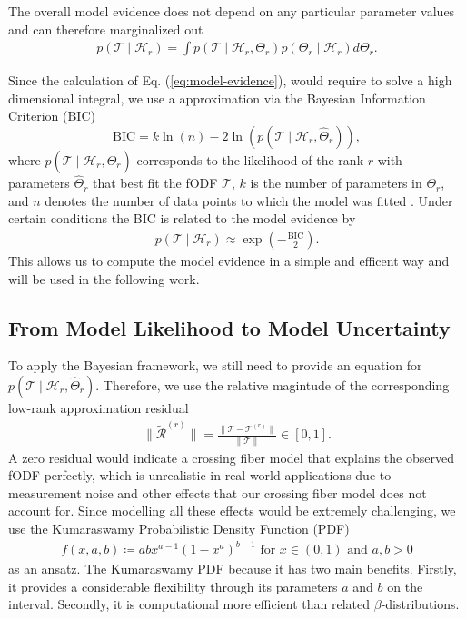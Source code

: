 The overall model evidence does not depend on any particular parameter values
and can therefore marginalized out 
\begin{align}
	p \left( \mathcal{T} \mid \mathcal{H}_r \right) = \int p \left(
		\mathcal{T} \mid \mathcal{H}_r , \Theta_r 
	\right) p \left( \Theta_r \mid \mathcal{H}_r  \right) d \Theta_r. 
	\label{eq:model-evidence}
\end{align}

Since the calculation of Eq. (\ref{eq:model-evidence}), would require to solve a
high dimensional integral, we use a approximation via the Bayesian Information
Criterion (BIC) 
\[ \text{BIC} = k \ln \left( n \right) - 2 \ln \left( p \left( \mathcal{T} \mid
\mathcal{H}_r, \hat{\Theta}_r \right) \right), \]
where $p \left(  \mathcal{T} \mid \mathcal{H}_r , \hat{\Theta}_r \right)$
corresponds to the likelihood of the rank-$r$ with parameters $\hat{\Theta}_r$
that best fit the fODF $\mathcal{T}$, $k$ is the number of parameters in
$\Theta_r$, and $n$ denotes the number of data points to which the model was
fitted \cite{Schwarz1978}. Under certain conditions the BIC is related to the
model evidence by \cite{Konishi2008}
\begin{align}
	p \left( \mathcal{T} \mid \mathcal{H}_r \right) \approx \exp \left(  -
		\frac{\text{BIC}}{2}
\right).
	\label{eq:BIC-model}
\end{align}
This allows us to compute the model evidence in a simple and efficent way and
will be used in the following work. 
\subsection{From Model Likelihood to Model Uncertainty}
To apply the Bayesian framework, we still need to provide an equation for $p
\left( \mathcal{T} \mid \mathcal{H}_r , \hat{\Theta}_r \right)$. Therefore, we
use the relative magintude of the corresponding low-rank approximation residual 
\begin{align}
	\| \tilde{\mathcal{R}}^{\left( r \right)} \| = \frac{ \| \mathcal{T} -
	\mathcal{T}^{\left( r \right)} \| }{ \| \mathcal{T} \|} \in \left[ 0,1
	\right].
	\label{eq:residual}
\end{align}
A zero residual would indicate a crossing fiber model that explains the observed
fODF perfectly, which is unrealistic in real world applications due to
measurement noise and other effects that our crossing fiber model does not
account for. Since modelling all these effects would be extremely challenging,
we use the Kumaraswamy Probabilistic Density Function (PDF)
\cite{Kumaraswamy1980}
\begin{align}
	f \left( x, a, b \right) \coloneqq ab x^{a-1} \left( 1- x^a
	\right)^{b-1} \text{ for } x \in \left( 0,1 \right) \text{ and } a,b >
	0
	\label{eq:Kumaraswamy}
\end{align}
as an ansatz.
The Kumaraswamy PDF because it has two main benefits. Firstly, it
provides a considerable flexibility through its parameters $a$ and $b$ on the
interval. Secondly, it is computational more efficient than related
$\beta$-distributions. 

